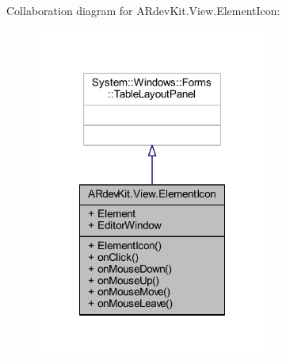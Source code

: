 Collaboration diagram for A\-Rdev\-Kit.\-View.\-Element\-Icon\-:
\nopagebreak
\begin{figure}[H]
\begin{center}
\leavevmode
\includegraphics[width=216pt]{class_a_rdev_kit_1_1_view_1_1_element_icon__coll__graph}
\end{center}
\end{figure}
